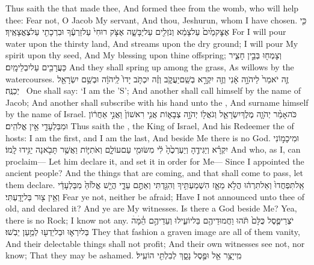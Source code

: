 {Thus saith the \lord\space that made thee, And formed thee from the womb, who will help thee: Fear not, O Jacob My servant, And thou, Jeshurun, whom I have chosen.}
{כִּ֤י אֶצׇּק\maqqaf מַ֙יִם֙ עַל\maqqaf צָמֵ֔א וְנֹזְלִ֖ים עַל\maqqaf יַבָּשָׁ֑ה אֶצֹּ֤ק רוּחִי֙ עַל\maqqaf זַרְעֶ֔ךָ וּבִרְכָתִ֖י עַל\maqqaf צֶאֱצָאֶֽיךָ׃}
{For I will pour water upon the thirsty land, And streams upon the dry ground; I will pour My spirit upon thy seed, And My blessing upon thine offspring;}
{וְצָמְח֖וּ בְּבֵ֣ין חָצִ֑יר כַּעֲרָבִ֖ים עַל\maqqaf יִבְלֵי\maqqaf מָֽיִם׃}
{And they shall spring up among the grass, As willows by the watercourses.}
{זֶ֤ה יֹאמַר֙ לַיהֹוָ֣ה אָ֔נִי וְזֶ֖ה יִקְרָ֣א בְשֵֽׁם\maqqaf יַעֲקֹ֑ב וְזֶ֗ה יִכְתֹּ֤ב יָדוֹ֙ לַֽיהֹוָ֔ה וּבְשֵׁ֥ם יִשְׂרָאֵ֖ל יְכַנֶּֽה׃ \petucha }
{One shall say: ‘I am the \lord’S’; And another shall call himself by the name of Jacob; And another shall subscribe with his hand unto the \lord, And surname himself by the name of Israel.}
{כֹּה\maqqaf אָמַ֨ר יְהֹוָ֧ה מֶלֶךְ\maqqaf יִשְׂרָאֵ֛ל וְגֹאֲל֖וֹ יְהֹוָ֣ה צְבָא֑וֹת אֲנִ֤י רִאשׁוֹן֙ וַאֲנִ֣י אַחֲר֔וֹן וּמִבַּלְעָדַ֖י אֵ֥ין אֱלֹהִֽים׃}
{Thus saith the \lord, the King of Israel, And his Redeemer the \lord\space of hosts: I am the first, and I am the last, And beside Me there is no God.}
{וּמִי\maqqaf כָמ֣וֹנִי יִקְרָ֗א וְיַגִּידֶ֤הָ וְיַעְרְכֶ֙הָ֙ לִ֔י מִשּׂוּמִ֖י עַם\maqqaf עוֹלָ֑ם וְאֹתִיּ֛וֹת וַאֲשֶׁ֥ר תָּבֹ֖אנָה יַגִּ֥ידוּ לָֽמוֹ׃}
{And who, as I, can proclaim— Let him declare it, and set it in order for Me— Since I appointed the ancient people? And the things that are coming, and that shall come to pass, let them declare.}
{אַֽל\maqqaf תִּפְחֲדוּ֙ וְאַל\maqqaf תִּרְה֔וּ הֲלֹ֥א מֵאָ֛ז הִשְׁמַעְתִּ֥יךָ וְהִגַּ֖דְתִּי וְאַתֶּ֣ם עֵדָ֑י הֲיֵ֤שׁ אֱל֙וֹהַּ֙ מִבַּלְעָדַ֔י וְאֵ֥ין צ֖וּר בַּל\maqqaf יָדָֽעְתִּי׃}
{Fear ye not, neither be afraid; Have I not announced unto thee of old, and declared it? And ye are My witnesses. Is there a God beside Me? Yea, there is no Rock; I know not any.}
{יֹצְרֵי\maqqaf פֶ֤סֶל כֻּלָּם֙ תֹּ֔הוּ וַחֲמוּדֵיהֶ֖ם בַּל\maqqaf יוֹעִ֑ילוּ וְעֵדֵיהֶ֣ם הֵ֗ׄמָּׄהׄ בַּל\maqqaf יִרְא֛וּ וּבַל\maqqaf יֵדְע֖וּ לְמַ֥עַן יֵבֹֽשׁוּ׃}
{They that fashion a graven image are all of them vanity, And their delectable things shall not profit; And their own witnesses see not, nor know; That they may be ashamed.}
{מִֽי\maqqaf יָצַ֥ר אֵ֖ל וּפֶ֣סֶל נָסָ֑ךְ לְבִלְתִּ֖י הוֹעִֽיל׃}
